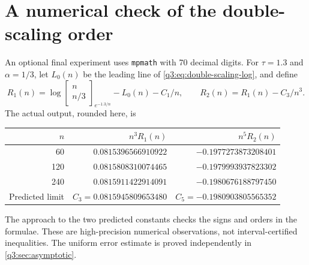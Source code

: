 \documentclass[11pt,a4paper,oneside,openany]{book}
\theoremstyle{definition}
\theoremstyle{remark}
\newcommand{\GB}[3][q]{\begin{bmatrix}#2\\#3\end{bmatrix}_{#1}}
\newcommand{\Gb}[3]{\GB[#3]{#1}{#2}}
\begin{document}
\section{A numerical check of the double-scaling order}
An optional final experiment uses \texttt{mpmath} with 70 decimal
digits. For $\tau=1.3$ and $\alpha=1/3$, let $L_0(n)$ be the leading
line of \cref{q3:eq:double-scaling-log}, and define
\[
 R_1(n)=\log\Gb n{n/3}{e^{-1.3/n}}-L_0(n)-C_1/n,
 \qquad R_2(n)=R_1(n)-C_3/n^3.
\]
The actual output, rounded here, is
\begin{center}
\begin{tabular}{@{}rrr@{}}
\toprule
$n$ & $n^3R_1(n)$ & $n^5R_2(n)$\\
\midrule
60  & $0.0815396566910922$ & $-0.1977273873208401$\\
120 & $0.0815808310074465$ & $-0.1979993937823302$\\
240 & $0.0815911422914091$ & $-0.1980676188797450$\\
\midrule
Predicted limit & $C_3=0.0815945809653480$ & $C_5=-0.1980903805565352$\\
\bottomrule
\end{tabular}
\end{center}
The approach to the two predicted constants checks the signs and
orders in the formulae. These are high-precision numerical observations,
not interval-certified inequalities. The uniform error estimate is
proved independently in \cref{q3:sec:asymptotic}.
\end{document}
